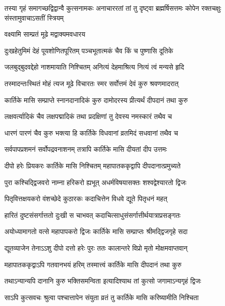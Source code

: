 \threelineshloka
{तस्या गृहं समागच्छद्विद्वान्वै कुत्सनामकः}
{अनाचाररतां तां तु दृष्ट्वा ब्रह्मर्षिसत्तमः}
{कोपेन रक्तचक्षुः संस्तामुवाचाऽसतीं स्त्रियम्} %



\onelineshloka
{वक्ष्यामि साम्प्रतं मूढे मद्वाक्यमवधारय} %

\twolineshloka
{दुःखहेतुमिमं देहं पूयशोणितपूरितम्}
{पञ्चभूतात्मकं चैव किं च पुष्णासि दूतिके} %

\twolineshloka
{जलबुद्बुदवद्देहो नाशमायाति निश्चितम्}
{अनित्यं देहमाश्रित्य नित्यं त्वं मन्यसे हृदि} %

\twolineshloka
{तस्मादन्तःस्थितं मोहं त्यज मूढे विचारतः}
{स्मर सर्वोत्तमं देवं कुरु श्रवणमादरात्} %

\twolineshloka
{कार्तिके मासि सम्प्राप्ते स्नानदानादिकं कुरु}
{दामोदरस्य प्रीत्यर्थं दीपदानं तथा कुरु} %

\twolineshloka
{लक्षवर्त्यादिकं चैव लक्षपद्मादिकं तथा}
{प्रदक्षिणां तु देवस्य नमस्कारं तथैव च} %

\twolineshloka
{धारणं पारणं चैव कुरु भक्त्या हि कार्तिके}
{विधवानां व्रतमिदं सधवानां तथैव च} %

\twolineshloka
{सर्वपापप्रशमनं सर्वोपद्रवनाशनम्}
{तत्रापि कार्तिके मासि दीयतां दीप उत्तमः} %

\twolineshloka
{दीपो हरेः प्रियकरः कार्तिके मासि निश्चितम्}
{महापातककृद्वापि दीपदानात्प्रमुच्यते} %

\twolineshloka
{पुरा कश्चिद्द्विजवरो नाम्ना हरिकरो ह्यभूत्}
{अधर्मविषयासक्तः शश्वद्वेश्यारतो द्विजः} %

\twolineshloka
{पितृवित्तक्षयकरो वंशच्छेदे कुठारकः}
{कदाचित्तेन विधवे द्यूते पितृधनं महत्} %

\twolineshloka
{हारितं दुष्टसंसर्गात्ततो दुःखी स चाभवत्}
{कदाचित्साधुसंसर्गात्तीर्थयात्राप्रसङ्गतः} %

\twolineshloka
{अयोध्यामागतो वत्से महापापकरो द्विजः}
{कार्तिके मासि सम्प्राप्तः श्रीमद्द्विजगृहे सदा} %

\twolineshloka
{द्यूतव्याजेन तेनाऽऽशु दीपो दत्तो हरेः पुरः}
{ततः कालान्तरे विप्रो मृतो मोक्षमवाप्तवान्} %

\twolineshloka
{महापातककृद्वाऽपि गतवानभयं हरिम्}
{तस्मात्त्वं कार्तिके मासि दीपदानं तथा कुरु} %

\twolineshloka
{तथाऽन्यान्यपि दानानि कुरु भक्तिसमन्विता}
{इत्यादिश्याथ तां कुत्सो जगामाऽन्यगृहं द्विजः} %

\twolineshloka
{साऽपि कुत्सवचः श्रुत्वा पश्चात्तापेन संयुता}
{व्रतं तु कार्तिके मासि करिष्यामीति निश्चिता} %

